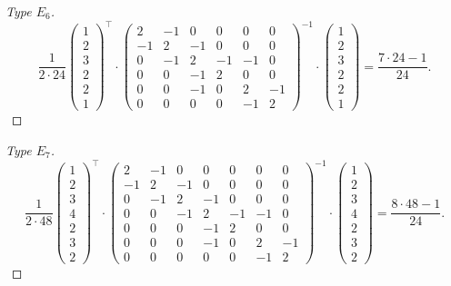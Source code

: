 \documentclass[11pt,a4paper]{amsart}
\theoremstyle{definition}
\begin{document}
\begin{proof}[Type $E_6$]


\[
\frac{1}{2\cdot 24}
\begin{pmatrix}
1 \\ 2 \\ 3 \\ 2 \\ 2 \\ 1
\end{pmatrix}^{\top}
\cdot
\begin{pmatrix}
2 & -1 & 0 & 0 & 0 & 0 \\
-1 & 2 & -1 & 0 & 0 & 0\\
0 & -1 & 2 & -1 & -1 & 0 \\
0 & 0 & -1 & 2 & 0 & 0 \\
0 & 0 & -1 & 0 & 2 & -1 \\
0 & 0 & 0 & 0 & -1 & 2
\end{pmatrix}^{-1}
\cdot
\begin{pmatrix}
1 \\ 2 \\ 3 \\ 2 \\ 2 \\ 1
\end{pmatrix}
=\frac{7\cdot 24-1}{24}.
\]
\end{proof}

\begin{proof}[Type $E_7$]
\[ 
\frac{1}{2\cdot 48}
\begin{pmatrix}
1 \\ 2 \\ 3 \\ 4 \\2  \\ 3 \\ 2
\end{pmatrix}^{\top}
\cdot
\begin{pmatrix}
2 & -1 & 0 & 0 & 0 & 0 & 0 \\
-1 & 2 & -1 & 0 & 0 & 0 & 0\\
0 & -1 & 2 & -1 & 0 & 0 & 0 \\
0 & 0 & -1 & 2 & -1 & -1 & 0 \\
0 & 0 & 0 & -1 & 2 & 0 & 0 \\
0 & 0 & 0 & -1 & 0 & 2 & -1 \\
0 & 0 & 0 & 0  & 0 & -1 & 2
\end{pmatrix}^{-1}
\cdot
\begin{pmatrix}
1 \\ 2 \\ 3 \\ 4 \\2  \\ 3 \\ 2
\end{pmatrix}
=\frac{8\cdot 48-1}{24}.
\]
\end{proof}
\end{document}
